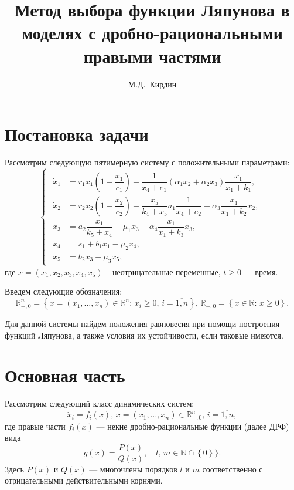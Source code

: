 \documentclass[14pt,a4paper]{extarticle}
\title{Метод выбора функции Ляпунова в моделях с дробно-рациональными правыми частями}
\author{М.Д.~Кирдин}
\begin{document}
	\maketitle
	
	\tableofcontents
	 
	\section{Постановка задачи}
	
	Рассмотрим следующую пятимерную систему с положительными параметрами:
	\begin{equation}
		\begin{cases}
			\begin{aligned}
				\dot{x}_1 &= r_1x_1\left(1-\dfrac{x_1}{c_1}\right)-\dfrac{1}{x_4+e_1}(\alpha_1x_2+\alpha_2x_3)\dfrac{x_1}{x_1+k_1},\\
				\dot{x}_2 &= r_2x_2\left(1-\dfrac{x_2}{c_2}\right)+\dfrac{x_5}{k_4+x_5}a_1\dfrac{1}{x_4+e_2}-\alpha_3\dfrac{x_1}{x_1+k_2}x_2,\\
				\dot{x}_3 &= a_2\dfrac{x_1}{k_5+x_4}-\mu_1x_3-\alpha_4\dfrac{x_1}{x_1+k_3}x_3,\\
				\dot{x}_4 &= s_1 + b_1x_1-\mu_2x_4,\\
				\dot{x}_5 &= b_2x_3-\mu_3x_5,
			\end{aligned}
		\end{cases}\label{eq:initial_system}
	\end{equation}
	где $x=(x_1, x_2, x_3, x_4, x_5)$ -- неотрицательные переменные, $t\ge0$ --- время.
	
	Введем следующие обозначения:
	\[\mathbb{R}^n_{+,0}=\left\{x=(x_1,\dots,x_n)\in\mathbb{R}^n:\, x_i\ge0,\, i=\overline{1,n}\right\},\,\mathbb{R}_{+,0}=\left\{x\in\mathbb{R}:\, x\ge0\right\}.\]
	
	Для данной системы найдем положения равновесия при помощи построения функций Ляпунова, а также условия их устойчивости, если таковые имеются. 
	
	\section{Основная часть}
	
	Рассмотрим следующий класс динамических систем:
	\[\dot{x}_i=f_i(x),\, x=(x_1,\dots,x_n)\in\mathbb{R}^{n}_{+,0},\, i=\overline{1,n},\]
	где правые части $f_i(x)$ --- некие дробно-рациональные функции (далее ДРФ) вида 
	\begin{equation*}
		g(x)=\dfrac{P(x)}{Q(x)},\quad l,\, m\in\mathbb{N}\cap\left\{0\right\}\}.
	\end{equation*}
	Здесь $P(x)$ и $Q(x)$ --- многочлены порядков $l$ и $m$ соответственно с отрицательными действительными корнями. 
	
\end{document}
